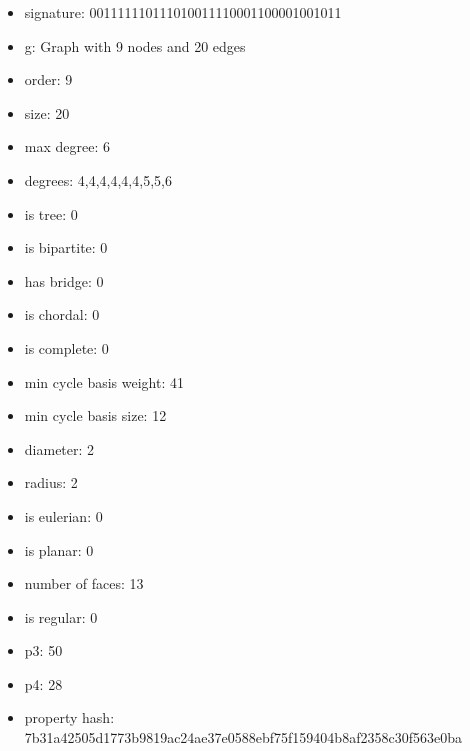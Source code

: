 \newpage
\begin{figure}
\end{figure}
\begin{itemize}
\item signature: 001111110111010011110001100001001011
\item g: Graph with 9 nodes and 20 edges
\item order: 9
\item size: 20
\item max degree: 6
\item degrees: 4,4,4,4,4,4,5,5,6
\item is tree: 0
\item is bipartite: 0
\item has bridge: 0
\item is chordal: 0
\item is complete: 0
\item min cycle basis weight: 41
\item min cycle basis size: 12
\item diameter: 2
\item radius: 2
\item is eulerian: 0
\item is planar: 0
\item number of faces: 13
\item is regular: 0
\item p3: 50
\item p4: 28
\item property hash: 7b31a42505d1773b9819ac24ae37e0588ebf75f159404b8af2358c30f563e0ba
\end{itemize}
